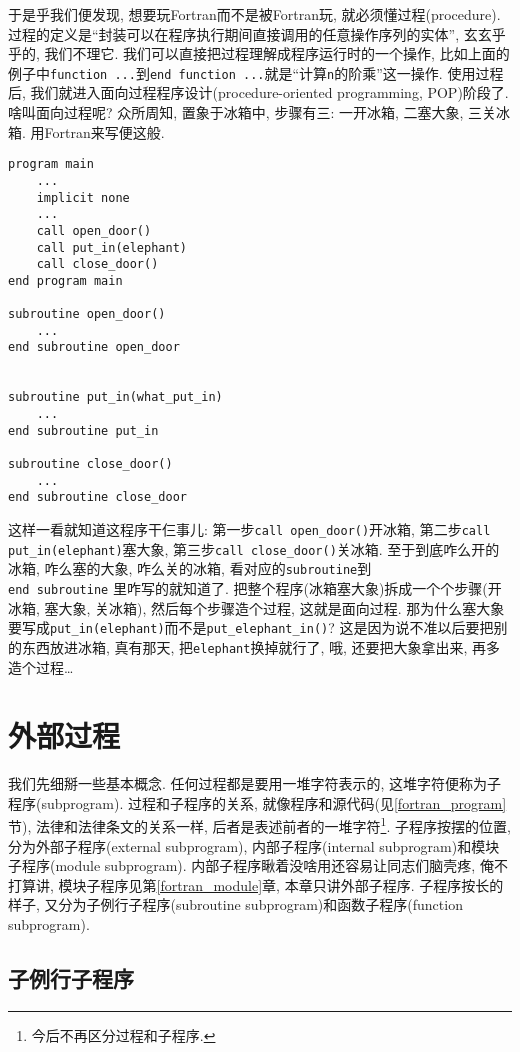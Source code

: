于是乎我们便发现, 想要玩Fortran而不是被Fortran玩, 就必须懂过程(procedure). 过程的定义是``封装可以在程序执行期间直接调用的任意操作序列的实体'', 玄玄乎乎的, 我们不理它. 我们可以直接把过程理解成程序运行时的一个操作, 比如上面的例子中\verb|function ...|到\verb|end function ...|就是``计算\verb|n|的阶乘''这一操作. 使用过程后, 我们就进入面向过程程序设计(procedure-oriented programming, POP)阶段了. 啥叫面向过程呢? 众所周知, 置象于冰箱中, 步骤有三: 一开冰箱, 二塞大象, 三关冰箱. 用Fortran来写便这般.
\begin{verbatim}
program main
    ...
    implicit none
    ...
    call open_door()
    call put_in(elephant)
    call close_door()
end program main

subroutine open_door()
    ...
end subroutine open_door


subroutine put_in(what_put_in)
    ...
end subroutine put_in

subroutine close_door()
    ...
end subroutine close_door
\end{verbatim}
这样一看就知道这程序干仨事儿: 第一步\verb|call open_door()|开冰箱, 第二步\verb|call put_in(elephant)|塞大象, 第三步\verb|call close_door()|关冰箱. 至于到底咋么开的冰箱, 咋么塞的大象, 咋么关的冰箱, 看对应的\verb|subroutine|到\\\verb|end subroutine|
里咋写的就知道了. 把整个程序(冰箱塞大象)拆成一个个步骤(开冰箱, 塞大象, 关冰箱), 然后每个步骤造个过程, 这就是面向过程. 那为什么塞大象要写成\verb|put_in(elephant)|而不是\verb|put_elephant_in()|? 这是因为说不准以后要把别的东西放进冰箱, 真有那天, 把\verb|elephant|换掉就行了, 哦, 还要把大象拿出来, 再多造个过程\dots

\section{外部过程}

我们先细掰一些基本概念. 任何过程都是要用一堆字符表示的, 这堆字符便称为子程序(subprogram). 过程和子程序的关系, 就像程序和源代码(见\ref{fortran_program}节), 法律和法律条文的关系一样, 后者是表述前者的一堆字符\footnote{今后不再区分过程和子程序.}. 子程序按摆的位置, 分为外部子程序(external subprogram), 内部子程序(internal subprogram)和模块子程序(module subprogram). 内部子程序瞅着没啥用还容易让同志们脑壳疼, 俺不打算讲, 模块子程序见第\ref{fortran_module}章, 本章只讲外部子程序. 子程序按长的样子, 又分为子例行子程序(subroutine subprogram)和函数子程序(function subprogram).

\subsection{子例行子程序}

